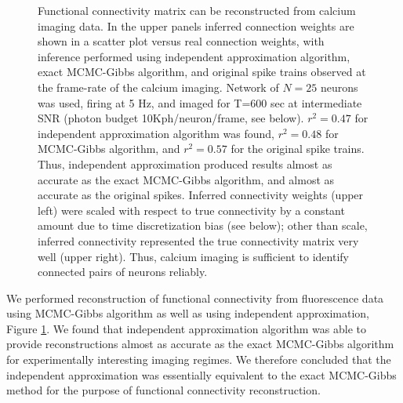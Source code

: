 \begin{figure}[h]
\caption{Functional connectivity matrix can be reconstructed from calcium imaging data.
In the upper panels inferred connection weights are shown in a scatter plot versus real connection weights, with inference performed using independent approximation algorithm, exact MCMC-Gibbs algorithm, and original spike trains observed at the frame-rate of the calcium imaging. Network of $N=25$ neurons was used, firing at 5 Hz, and imaged for T=600 sec at intermediate SNR (photon budget 10Kph/neuron/frame, see below).
$r^2=0.47$ for independent approximation algorithm was found, $r^2=0.48$ for MCMC-Gibbs algorithm, and $r^2=0.57$ for the original spike trains. 
Thus, independent approximation produced results almost as accurate as the exact MCMC-Gibbs algorithm, and almost as accurate as the original spikes.
Inferred connectivity weights (upper left) were scaled with respect to true connectivity by a constant amount due to time discretization bias (see below); other than scale, inferred connectivity represented the true connectivity matrix very well (upper right).
Thus, calcium imaging is sufficient to identify connected pairs of neurons reliably.}
\label{fig:scatters}
\end{figure}


We performed reconstruction of functional connectivity from fluorescence data using MCMC-Gibbs algorithm as well as using independent approximation, Figure \ref{fig:scatters}. We found that independent approximation algorithm was able to provide reconstructions almost as accurate as the exact MCMC-Gibbs algorithm for experimentally interesting imaging regimes. We therefore concluded that the independent approximation was essentially equivalent to the exact MCMC-Gibbs method for the purpose of functional connectivity reconstruction.

